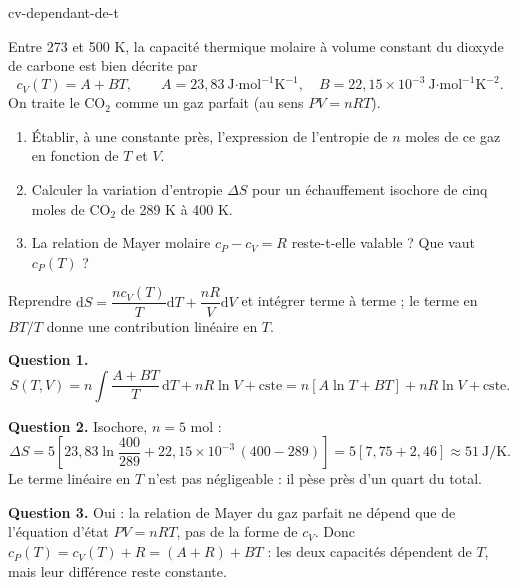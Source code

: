 \begin{exo}{cv-dependant-de-t}

Entre 273 et 500 K, la capacité thermique molaire à volume constant du dioxyde de carbone est bien décrite par
\[
c_V(T) = A + BT, \qquad A = 23{,}83\ \text{J·mol}^{-1}\text{K}^{-1}, \quad B = 22{,}15\times10^{-3}\ \text{J·mol}^{-1}\text{K}^{-2}.
\]
On traite le CO$_2$ comme un gaz parfait (au sens $PV = nRT$).

\begin{enumerate}
\item Établir, à une constante près, l'expression de l'entropie de $n$ moles de ce gaz en fonction de $T$ et $V$.
\item Calculer la variation d'entropie $\Delta S$ pour un échauffement isochore de cinq moles de CO$_2$ de 289 K à 400 K.
\item La relation de Mayer molaire $c_P - c_V = R$ reste-t-elle valable ? Que vaut $c_P(T)$ ?
\end{enumerate}

\begin{indication}
Reprendre $\mathrm{d}S = \dfrac{nc_V(T)}{T}\mathrm{d}T + \dfrac{nR}{V}\mathrm{d}V$ et intégrer terme à terme ; le terme en $BT/T$ donne une contribution linéaire en $T$.
\end{indication}

\begin{solution}
\textbf{Question 1.}
\[
S(T,V) = n\!\int\!\frac{A + BT}{T}\,\mathrm{d}T + nR\ln V + \text{cste} = n\left[A\ln T + BT\right] + nR\ln V + \text{cste}.
\]

\textbf{Question 2.} Isochore, $n = 5$ mol :
\[
\Delta S = 5\left[23{,}83\ln\frac{400}{289} + 22{,}15\times10^{-3}\,(400 - 289)\right] = 5\left[7{,}75 + 2{,}46\right] \approx 51\ \text{J/K}.
\]
Le terme linéaire en $T$ n'est pas négligeable : il pèse près d'un quart du total.

\textbf{Question 3.} Oui : la relation de Mayer du gaz parfait ne dépend que de l'équation d'état $PV = nRT$, pas de la forme de $c_V$. Donc $c_P(T) = c_V(T) + R = (A + R) + BT$ : les deux capacités dépendent de $T$, mais leur différence reste constante.
\end{solution}
\end{exo}

